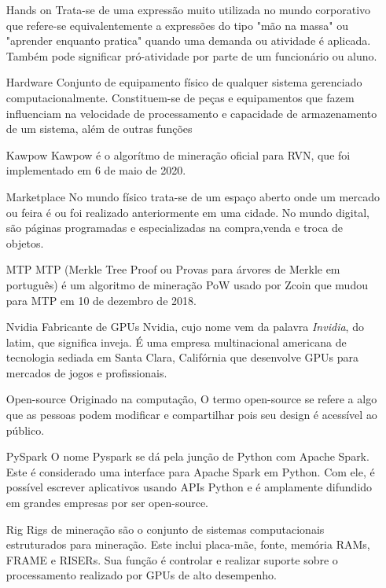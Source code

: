 \begin{center}
\begin{itemize}
		\item[Hands on] Trata-se de uma expressão muito utilizada no mundo corporativo que refere-se equivalentemente a expressões do tipo "mão na massa" ou "aprender enquanto pratica" quando uma demanda ou atividade é aplicada. Também pode significar pró-atividade por parte de um funcionário ou aluno.
		
		\item[Hardware] Conjunto de equipamento físico de qualquer sistema gerenciado computacionalmente. Constituem-se de peças e equipamentos que fazem influenciam na velocidade de processamento e capacidade de armazenamento de um sistema, além de outras funções
		
		\item[Kawpow] Kawpow é o algorítmo de mineração oficial para RVN, que foi implementado em 6 de maio de 2020.
		
		\item[Marketplace] No mundo físico trata-se de um espaço aberto onde um mercado ou feira é ou foi realizado anteriormente em uma cidade. No mundo digital, são páginas programadas e especializadas na compra,venda e troca de objetos.
		
		\item[MTP] MTP (Merkle Tree Proof ou Provas para árvores de Merkle em português) é um algoritmo de mineração PoW usado por Zcoin que mudou para MTP em 10 de dezembro de 2018.
		
		\item[Nvidia] Fabricante de GPUs Nvidia, cujo nome vem da palavra \textit{Invidia}, do latim, que significa inveja. É uma empresa multinacional americana de tecnologia sediada em Santa Clara, Califórnia que desenvolve GPUs para mercados de jogos e profissionais.
		
		\item[Open-source] Originado na computação, 
		O termo open-source se refere a algo que as pessoas podem modificar e compartilhar pois seu design é acessível ao público.
				
		\item[PySpark]  O nome Pyspark se dá pela junção de Python com Apache Spark. Este é considerado uma interface para Apache Spark em Python. Com ele, é possível escrever aplicativos usando APIs Python e é amplamente difundido em grandes empresas por ser open-source.
		
		\item[Rig] Rigs de mineração são o conjunto de sistemas computacionais estruturados para mineração. Este inclui placa-mãe, fonte, memória RAMs, FRAME e RISERs. Sua função é controlar e realizar suporte sobre o processamento realizado por GPUs de alto desempenho.
		

\end{itemize}
\end{center}

